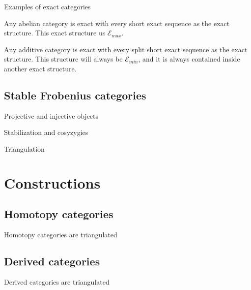 \documentclass{beamer}
\begin{document}
            \begin{frame}{Examples of exact categories}
                \begin{example}
                    Any abelian category is exact with every short exact sequence as the exact structure. This exact structure us $\mathcal{E}_{max}$.
                \end{example}
            
                \begin{example}
                    Any additive category is exact with every split short exact sequence as the exact structure. This structure will always be $\mathcal{E}_{min}$, and it is always contained inside another exact structure.
                \end{example}
            \end{frame}
        \subsection{Stable Frobenius categories}
            \begin{frame}{Projective and injective objects}
                
            \end{frame}
            \begin{frame}{Stabilization and cosyzygies}
                
            \end{frame}
            \begin{frame}{Triangulation}
                
            \end{frame}

    \section{Constructions}
        \subsection{Homotopy categories}
            \begin{frame}{Homotopy categories are triangulated}
                
            \end{frame}
        \subsection{Derived categories}
            \begin{frame}{Derived categories are triangulated}
                
            \end{frame}
\end{document}
